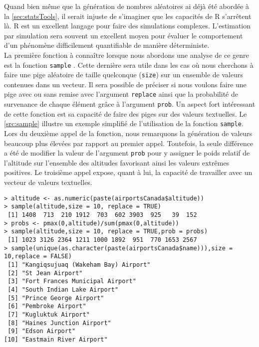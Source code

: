 Quand bien même que la génération de nombres aléatoires ai déjà été abordée à la \autoref{sec:statsTools}, il serait injuste de s'imaginer que les capacités de R s'arrêtent là. R est un excellent langage pour faire des simulations complexes. L'estimation par simulation sera souvent un excellent moyen pour évaluer le comportement d'un phénomène difficilement quantifiable de manière déterministe. \\

La première fonction à connaître lorsque nous abordons une analyse de ce genre est la fonction \texttt{sample} \cite{Rfunction:sample}. Cette dernière sera utile dans les cas où nous cherchons à faire une pige aléatoire de taille quelconque (\texttt{size}) sur un ensemble de valeurs contenues dans un vecteur. Il sera possible de préciser si nous voulons faire une pige avec ou sans remise avec l'argument \texttt{replace} ainsi que la probabilité de survenance de chaque élément grâce à l'argument \texttt{prob}. Un aspect fort intéressant de cette fonction est sa capacité de faire des piges sur des valeurs textuelles. Le \autoref{src:sample} illustre un exemple simplifié de l'utilisation de la fonction \texttt{sample}. Lors du deuxième appel de la fonction, nous remarquons la génération de valeurs beaucoup plus élevées par rapport au premier appel. Toutefois, la seule différence a été de modifier la valeur de l'argument \texttt{prob} pour y assigner le poids relatif de l'altitude sur l'ensemble des altitudes favorisant ainsi les valeurs extrêmes positives. Le troisième appel expose, quant à lui, la capacité de travailler avec un vecteur de valeurs textuelles. \\

\begin{lstlisting}[caption = Pige aléatoire sur support vectoriel,label=src:sample]
> altitude <- as.numeric(paste(airportsCanada$altitude))
> sample(altitude,size = 10, replace = TRUE)
 [1] 1408  713  210 1912  703  602 3903  925   39  152
> probs <- pmax(0,altitude)/sum(pmax(0,altitude))
> sample(altitude,size = 10, replace = TRUE,prob = probs)
 [1] 1023 3126 2364 1211 1000 1892  951  770 1653 2567
> sample(unique(as.character(paste(airportsCanada$name))),size = 10,replace = FALSE)
 [1] "Kangiqsujuaq (Wakeham Bay) Airport"
 [2] "St Jean Airport"                   
 [3] "Fort Frances Municipal Airport"    
 [4] "South Indian Lake Airport"         
 [5] "Prince George Airport"             
 [6] "Pembroke Airport"                  
 [7] "Kugluktuk Airport"                 
 [8] "Haines Junction Airport"           
 [9] "Edson Airport"                     
[10] "Eastmain River Airport"  
\end{lstlisting}

